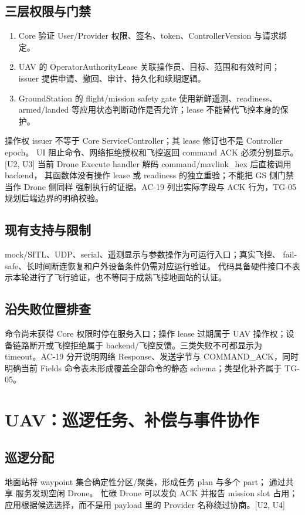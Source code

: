 \subsection{三层权限与门禁}
\begin{enumerate}
\item Core 验证 User/Provider 权限、签名、token、ControllerVersion 与请求绑定。
\item UAV 的 OperatorAuthorityLease 关联操作员、目标、范围和有效时间；
issuer 提供申请、撤回、审计、持久化和续期逻辑。
\item GroundStation 的 flight/mission safety gate 使用新鲜遥测、readiness、
armed/landed 等应用状态判断动作是否允许；lease 不能替代飞控本身的保护。
\end{enumerate}
操作权 issuer 不等于 Core ServiceController；其 lease 修订也不是 Controller epoch。
UI 阻止命令、网络拒绝授权和飞控返回 command ACK 必须分别显示。[U2, U3]
当前 Drone Execute handler 解码 command/mavlink\_hex 后直接调用 backend，
其函数体没有操作 lease 或 readiness 的独立重验；不能把 GS 侧门禁当作 Drone 侧同样
强制执行的证据。AC-19 列出实际字段与 ACK 行为，TG-05 规划后端边界的明确校验。

\subsection{现有支持与限制}
mock/SITL、UDP、serial、遥测显示与参数操作为可运行入口；真实飞控、
fail-safe、长时间断连恢复和户外设备条件仍需对应运行验证。
代码具备硬件接口不表示本轮进行了飞行验证，也不等同于成熟飞控地面站的认证。


\subsection{沿失败位置排查}
命令尚未获得 Core 权限时停在服务入口；操作 lease 过期属于 UAV 操作权；设备链路断开或飞控拒绝属于 backend/飞控反馈。三类失败不可都显示为 timeout。AC-19 分开说明网络 Response、发送字节与 COMMAND\_ACK，同时明确当前 Fields 命令表未形成覆盖全部命令的静态 schema；类型化补齐属于 TG-05。

\newpage

\section{UAV：巡逻任务、补偿与事件协作}
\subsection{巡逻分配}
地面站将 waypoint 集合确定性分区/聚类，形成任务 plan 与多个 part；
通过共享  服务发现空闲 Drone。
忙碌 Drone 可以发负 ACK 并报告 mission slot 占用；应用根据候选选择，而不是用 payload
里的 Provider 名称绕过协商。[U2, U4]

